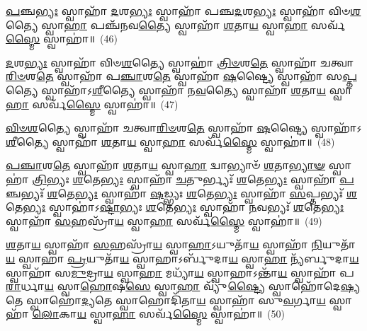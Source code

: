 {\anuvakamend[{\-\ul{𑌚}\-𑌤𑍁\-\ul{𑌰𑍍𑌭𑍍𑌯𑌃} 𑌷𑌣𑍍𑌣᳴𑌵\-\ul{𑌤𑍍𑌯𑍈} 𑌷𑍋𑌡᳴𑌶}]}%

\-\ul{𑌪}\-𑌞𑍍𑌚\-\ul{𑌭𑍍𑌯𑌃} 𑌸𑍍𑌵𑌾𑌹𑌾᳴ \ul{𑌦}\-𑌶\-\ul{𑌭𑍍𑌯𑌃} 𑌸𑍍𑌵𑌾𑌹𑌾᳴ 𑌪𑌞𑍍𑌚\-\ul{𑌦}\-𑌶\-\ul{𑌭𑍍𑌯𑌃} 𑌸𑍍𑌵𑌾𑌹𑌾᳴ 𑌵𑌿𑍞\-\ul{𑌶}\-𑌤𑍍𑌯𑍈 𑌸𑍍𑌵𑌾\-\ul{𑌹𑌾} 𑌪𑌞𑍍𑌚᳴𑌨𑌵\-\ul{𑌤𑍍𑌯𑍈} 𑌸𑍍𑌵𑌾𑌹𑌾᳴ \ul{𑌶}\-𑌤𑌾\-\ul{𑌯} 𑌸𑍍𑌵𑌾\-\ul{𑌹𑌾} 𑌸𑌰𑍍𑌵᳴\-\ul{𑌸𑍍𑌮𑍈} 𑌸𑍍𑌵𑌾𑌹𑌾॑॥~(46)

{\anuvakamend[{\-\ul{𑌪}\-𑌞𑍍𑌚\-\ul{𑌭𑍍𑌯𑌃} 𑌪़𑌞𑍍𑌚᳴𑌨𑌵\-\ul{𑌤𑍍𑌯𑍈} 𑌚𑌤𑍁᳴𑌰𑍍𑌦𑌶}]}%

\-\ul{𑌦}\-𑌶\-\ul{𑌭𑍍𑌯𑌃} 𑌸𑍍𑌵𑌾𑌹𑌾᳴ 𑌵𑌿𑍞\-\ul{𑌶}\-𑌤𑍍𑌯𑍈 𑌸𑍍𑌵𑌾𑌹𑌾॑ \ul{𑌤𑍍𑌰𑌿}\-\-\ul{𑍞}\-𑌶\-\ul{𑌤𑍇} 𑌸𑍍𑌵𑌾𑌹𑌾᳴ 𑌚𑌤𑍍𑌵𑌾\-\ul{𑌰𑌿}\-\-\ul{𑍞}\-𑌶\-\ul{𑌤𑍇} 𑌸𑍍𑌵𑌾𑌹𑌾᳴ 𑌪\-\ul{𑌞𑍍𑌚𑌾}\-𑌶\-\ul{𑌤𑍇} 𑌸𑍍𑌵𑌾𑌹𑌾᳴ \ul{𑌷}\-𑌷𑍍𑌟𑍍𑌯𑍈 𑌸𑍍𑌵𑌾𑌹𑌾᳴ 𑌸\-\ul{𑌪𑍍𑌤}\-𑌤𑍍𑌯𑍈 𑌸𑍍𑌵𑌾𑌹𑌾᳴\-𑌽\-\ul{𑌶𑍀}\-𑌤𑍍𑌯𑍈 𑌸𑍍𑌵𑌾𑌹𑌾᳴ 𑌨\-\ul{𑌵}\-𑌤𑍍𑌯𑍈 𑌸𑍍𑌵𑌾𑌹𑌾᳴ \ul{𑌶}\-𑌤𑌾\-\ul{𑌯} 𑌸𑍍𑌵𑌾\-\ul{𑌹𑌾} 𑌸𑌰𑍍𑌵᳴\-\ul{𑌸𑍍𑌮𑍈} 𑌸𑍍𑌵𑌾𑌹𑌾॑॥~(47)

{\anuvakamend[{\-\ul{𑌦}\-𑌶\-\ul{𑌭𑍍𑌯𑍋} 𑌦𑍍𑌵𑌾𑌵𑌿𑍞᳴𑌶𑌤𑌿𑌃}]}%

\-\ul{𑌵𑌿}\-\-\ul{𑍞}\-\-\ul{𑌶}\-𑌤𑍍𑌯𑍈 𑌸𑍍𑌵𑌾𑌹𑌾᳴ 𑌚𑌤𑍍𑌵𑌾\-\ul{𑌰𑌿}\-\-\ul{𑍞}\-𑌶\-\ul{𑌤𑍇} 𑌸𑍍𑌵𑌾𑌹𑌾᳴ \ul{𑌷}\-𑌷𑍍𑌟𑍍𑌯𑍈 𑌸𑍍𑌵𑌾𑌹𑌾᳴\-𑌽\-\ul{𑌶𑍀}\-𑌤𑍍𑌯𑍈 𑌸𑍍𑌵𑌾𑌹𑌾᳴ \ul{𑌶}\-𑌤𑌾\-\ul{𑌯} 𑌸𑍍𑌵𑌾\-\ul{𑌹𑌾} 𑌸𑌰𑍍𑌵᳴\-\ul{𑌸𑍍𑌮𑍈} 𑌸𑍍𑌵𑌾𑌹𑌾॑॥~(48)

{\anuvakamend[{\-\ul{𑌵𑌿}\-\-\ul{𑍞}\-\-\ul{𑌶}\-𑌤𑍍𑌯𑍈 𑌦𑍍𑌵𑌾𑌦᳴𑌶}]}%

\-\ul{𑌪}\-\-\ul{𑌞𑍍𑌚𑌾}\-𑌶\-\ul{𑌤𑍇} 𑌸𑍍𑌵𑌾𑌹𑌾᳴ \ul{𑌶}\-𑌤𑌾\-\ul{𑌯} 𑌸𑍍𑌵𑌾\-\ul{𑌹𑌾} 𑌦𑍍𑌵𑌾𑌭𑍍𑌯𑌾𑍞᳴ \ul{𑌶}\-𑌤𑌾\-\ul{𑌭𑍍𑌯𑌾}\-\-\ul{𑍟} 𑌸𑍍𑌵𑌾𑌹𑌾॑ \ul{𑌤𑍍𑌰𑌿}\-𑌭𑍍𑌯𑌃 \ul{𑌶}\-𑌤𑍇\-\ul{𑌭𑍍𑌯𑌃} 𑌸𑍍𑌵𑌾𑌹𑌾᳴ \ul{𑌚}\-𑌤𑍁𑌰𑍍𑌭𑍍𑌯𑌃᳴ \ul{𑌶}\-𑌤𑍇\-\ul{𑌭𑍍𑌯𑌃} 𑌸𑍍𑌵𑌾𑌹𑌾᳴ \ul{𑌪}\-𑌞𑍍𑌚𑌭𑍍𑌯𑌃᳴ \ul{𑌶}\-𑌤𑍇\-\ul{𑌭𑍍𑌯𑌃} 𑌸𑍍𑌵𑌾𑌹𑌾᳴ \ul{𑌷}\-𑌡𑍍𑌭𑍍𑌯𑌃 \ul{𑌶}\-𑌤𑍇\-\ul{𑌭𑍍𑌯𑌃} 𑌸𑍍𑌵𑌾𑌹𑌾᳴ \ul{𑌸}\-𑌪𑍍𑌤𑌭𑍍𑌯𑌃᳴ \ul{𑌶}\-𑌤𑍇\-\ul{𑌭𑍍𑌯𑌃} 𑌸𑍍𑌵𑌾𑌹𑌾॑\-𑌽\-\ul{𑌷𑍍𑌟𑌾}\-𑌭𑍍𑌯𑌃 \ul{𑌶}\-𑌤𑍇\-\ul{𑌭𑍍𑌯𑌃} 𑌸𑍍𑌵𑌾𑌹𑌾᳴ \ul{𑌨}\-𑌵𑌭𑍍𑌯𑌃᳴ \ul{𑌶}\-𑌤𑍇\-\ul{𑌭𑍍𑌯𑌃} 𑌸𑍍𑌵𑌾𑌹𑌾᳴ \ul{𑌸}\-𑌹𑌸𑍍𑌰𑌾᳴\-\ul{𑌯} 𑌸𑍍𑌵𑌾\-\ul{𑌹𑌾} 𑌸𑌰𑍍𑌵᳴\-\ul{𑌸𑍍𑌮𑍈} 𑌸𑍍𑌵𑌾𑌹𑌾॑॥~(49)

{\anuvakamend[{\-\ul{𑌪}\-\-\ul{𑌞𑍍𑌚𑌾}\-𑌶\-\ul{𑌤𑍇} 𑌦𑍍𑌵𑌾𑌤𑍍𑌰𑌿𑍞᳴𑌶𑌤𑍍}]}%

\-\ul{𑌶}\-𑌤𑌾\-\ul{𑌯} 𑌸𑍍𑌵𑌾𑌹𑌾᳴ \ul{𑌸}\-𑌹𑌸𑍍𑌰𑌾᳴\-\ul{𑌯} 𑌸𑍍𑌵𑌾\-\ul{𑌹𑌾}\-\-𑌽𑌯𑍁𑌤𑌾᳴\-\ul{𑌯} 𑌸𑍍𑌵𑌾𑌹𑌾᳴ \ul{𑌨𑌿}\-𑌯𑍁𑌤𑌾᳴\-\ul{𑌯} 𑌸𑍍𑌵𑌾𑌹𑌾॑ \ul{𑌪𑍍𑌰}\-𑌯𑍁𑌤𑌾᳴\-\ul{𑌯} 𑌸𑍍𑌵𑌾𑌹𑌾\-𑌽𑌰𑍍𑌬𑍁᳴𑌦𑌾\-\ul{𑌯} 𑌸𑍍𑌵𑌾\-\ul{𑌹𑌾} 𑌨𑍍𑌯᳴𑌰𑍍𑌬𑍁𑌦𑌾\-\ul{𑌯} 𑌸𑍍𑌵𑌾𑌹𑌾᳴ 𑌸\-\ul{𑌮𑍁}\-𑌦𑍍𑌰𑌾\-\ul{𑌯} 𑌸𑍍𑌵𑌾\-\ul{𑌹𑌾} 𑌮𑌧𑍍𑌯𑌾᳴\-\ul{𑌯} 𑌸𑍍𑌵𑌾𑌹𑌾\-𑌽𑌨𑍍𑌤𑌾᳴\-\ul{𑌯} 𑌸𑍍𑌵𑌾𑌹𑌾᳴ 𑌪\-\ul{𑌰𑌾}\-𑌰𑍍𑌧𑌾\-\ul{𑌯} 𑌸𑍍𑌵𑌾\-\ul{𑌹𑍋}\-𑌷\-\ul{𑌸𑍇} 𑌸𑍍𑌵𑌾\-\ul{𑌹𑌾} 𑌵𑍍𑌯𑍁᳴\-\ul{𑌷𑍍𑌟𑍍𑌯𑍈} 𑌸𑍍𑌵𑌾𑌹𑍋᳴𑌦𑍇\-\ul{𑌷𑍍𑌯}\-𑌤𑍇 𑌸𑍍𑌵𑌾𑌹𑍋॑\-\ul{𑌦𑍍𑌯}\-𑌤𑍇 𑌸𑍍𑌵𑌾𑌹𑍋𑌦𑌿᳴𑌤𑌾\-\ul{𑌯} 𑌸𑍍𑌵𑌾𑌹𑌾᳴ 𑌸𑍁\-\ul{𑌵}\-𑌰𑍍𑌗𑌾\-\ul{𑌯} 𑌸𑍍𑌵𑌾𑌹𑌾᳴ \ul{𑌲𑍋}\-𑌕𑌾\-\ul{𑌯} 𑌸𑍍𑌵𑌾\-\ul{𑌹𑌾} 𑌸𑌰𑍍𑌵᳴\-\ul{𑌸𑍍𑌮𑍈} 𑌸𑍍𑌵𑌾𑌹𑌾॑॥~(50)


